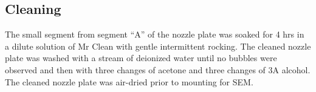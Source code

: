 \subsection{Cleaning}

The small segment from segment ``A'' of the
nozzle plate was soaked for 4 hrs in a dilute
solution of Mr Clean with gentle intermittent 
rocking. The cleaned nozzle plate was washed with
a stream of deionized water until no bubbles were
observed and then with three changes of acetone
and three changes of 3A alcohol. The cleaned
nozzle plate was air-dried prior to mounting
for SEM.

\endinput
